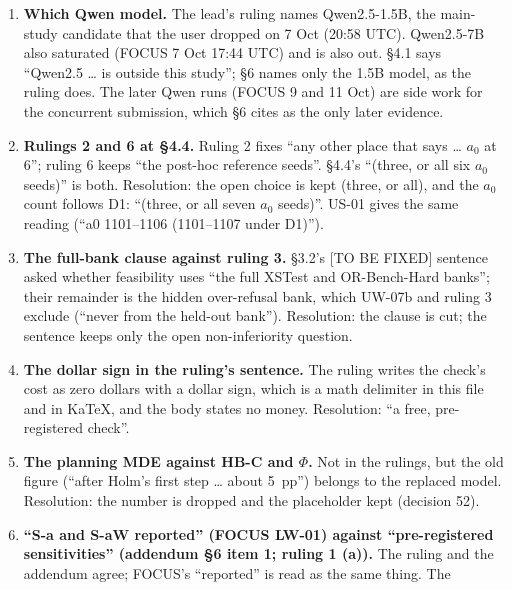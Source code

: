 \documentclass{article}
\theoremstyle{plain}
\theoremstyle{definition}
\theoremstyle{remark}
\begin{document}
\begin{enumerate}
        window''; Appendix C.10 says the rest. The script's default classifier
        is the Llama-2-13b one, not the validation classifier that the study
        uses; the clip is the shared part.
  \item \textbf{Which Qwen model.} The lead's ruling names Qwen2.5-1.5B, the
        main-study candidate that the user dropped on 7 Oct (20:58 UTC).
        Qwen2.5-7B also saturated (FOCUS 7 Oct 17:44 UTC) and is also out.
        \S{}4.1 says ``Qwen2.5 \ldots{} is outside this study''; \S{}6 names
        only the 1.5B model, as the ruling does. The later Qwen runs (FOCUS 9
        and 11 Oct) are side work for the concurrent submission, which \S{}6
        cites as the only later evidence.
  \item \textbf{Rulings 2 and 6 at \S{}4.4.} Ruling 2 fixes ``any other place
        that says \ldots{} $a_0$ at 6''; ruling 6 keeps ``the post-hoc reference
        seeds''. \S{}4.4's ``(three, or all six $a_0$ seeds)'' is both.
        Resolution: the open choice is kept (three, or all), and the $a_0$ count
        follows D1: ``(three, or all seven $a_0$ seeds)''. US-01 gives the same
        reading (``a0 1101--1106 (1101--1107 under D1)'').
  \item \textbf{The full-bank clause against ruling 3.} \S{}3.2's [TO BE FIXED]
        sentence asked whether feasibility uses ``the full XSTest and
        OR-Bench-Hard banks''; their remainder is the hidden over-refusal bank,
        which UW-07b and ruling 3 exclude (``never from the held-out bank'').
        Resolution: the clause is cut; the sentence keeps only the open
        non-inferiority question.
  \item \textbf{The dollar sign in the ruling's sentence.} The ruling writes the
        check's cost as zero dollars with a dollar sign, which is a math
        delimiter in this file and in KaTeX, and the body states no money.
        Resolution: ``a free, pre-registered check''.
  \item \textbf{The planning MDE against HB-C and $\Phi$.} Not in the rulings,
        but the old figure (``after Holm's first step \ldots{} about 5~pp'')
        belongs to the replaced model. Resolution: the number is dropped and the
        placeholder kept (decision 52).
  \item \textbf{``S-a and S-aW reported'' (FOCUS LW-01) against ``pre-registered
        sensitivities'' (addendum \S{}6 item 1; ruling 1 (a)).} The ruling and
        the addendum agree; FOCUS's ``reported'' is read as the same thing. The

\end{enumerate}
\end{document}
